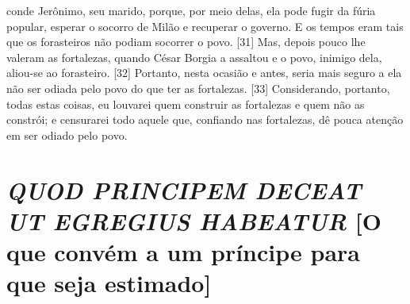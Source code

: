 conde Jerônimo, seu marido, porque, por meio delas, ela pode fugir da
fúria popular, esperar o socorro de Milão e recuperar o governo. E os
tempos eram tais que os forasteiros não podiam socorrer o povo. {[}31{]}
Mas, depois pouco lhe valeram as fortalezas, quando César Borgia a
assaltou e o povo, inimigo dela, aliou-se ao forasteiro. {[}32{]}
Portanto, nesta ocasião e antes, seria mais seguro a ela não ser odiada
pelo povo do que ter as fortalezas. {[}33{]} Considerando, portanto,
todas estas coisas, eu louvarei quem construir as fortalezas e quem não
as constrói; e censurarei todo aquele que, confiando nas fortalezas, dê
pouca atenção em ser odiado pelo povo.

\quebra\section{\emph{QUOD PRINCIPEM DECEAT UT EGREGIUS HABEATUR}
{[}O que convém a um príncipe para que seja estimado{]}}

